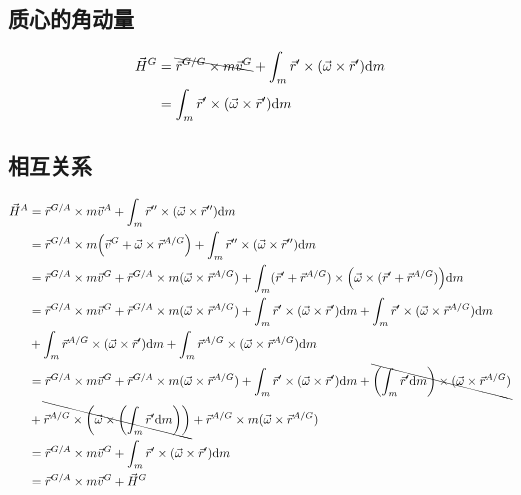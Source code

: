 \subsection{质心的角动量}
\begin{equation}
  \begin{split}
    \vec{H}^G&=\bcancel{\vec{r}^{G/G}\times m\vec{v}^G}+\int_m\vec{r}'\times(\vec{\omega}\times\vec{r}')\mathrm{d}m\\
    &=\int_m\vec{r}'\times(\vec{\omega}\times\vec{r}')\mathrm{d}m
  \end{split}
\end{equation}
\subsection{相互关系}
\begin{equation}
  \begin{split}
    \vec{H}^A&=\vec{r}^{G/A}\times m\vec{v}^A+\int_m\vec{r}''\times(\vec{\omega}\times\vec{r}'')\mathrm{d}m\\
    &=\vec{r}^{G/A}\times m\qty(\vec{v}^G+\vec{\omega}\times\vec{r}^{A/G})+\int_m\vec{r}''\times(\vec{\omega}\times\vec{r}'')\mathrm{d}m\\
    &=\vec{r}^{G/A}\times m\vec{v}^G+\vec{r}^{G/A}\times m(\vec{\omega}\times\vec{r}^{A/G})+\int_m(\vec{r}'+\vec{r}^{A/G})\times\qty(\vec{\omega}\times(\vec{r}'+\vec{r}^{A/G}))\mathrm{d}m\\
    &=\vec{r}^{G/A}\times m\vec{v}^G+\vec{r}^{G/A}\times m(\vec{\omega}\times\vec{r}^{A/G})+\int_m\vec{r}'\times(\vec{\omega}\times\vec{r}')\mathrm{d}m+\int_m\vec{r}'\times(\vec{\omega}\times\vec{r}^{A/G})\mathrm{d}m\\
    &+\int_m\vec{r}^{A/G}\times(\vec{\omega}\times\vec{r}')\mathrm{d}m+\int_m\vec{r}^{A/G}\times(\vec{\omega}\times\vec{r}^{A/G})\mathrm{d}m\\
    &=\vec{r}^{G/A}\times m\vec{v}^G+\vec{r}^{G/A}\times m(\vec{\omega}\times\vec{r}^{A/G})+\int_m\vec{r}'\times(\vec{\omega}\times\vec{r}')\mathrm{d}m+\bcancel{\qty(\int_m\vec{r}'\mathrm{d}m)\times(\vec{\omega}\times\vec{r}^{A/G})}\\
    &+\bcancel{\vec{r}^{A/G}\times\qty(\vec{\omega}\times\qty(\int_m\vec{r}'\mathrm{d}m))}+\vec{r}^{A/G}\times m(\vec{\omega}\times\vec{r}^{A/G})\\
    &=\vec{r}^{G/A}\times m\vec{v}^G+\int_m\vec{r}'\times(\vec{\omega}\times\vec{r}')\mathrm{d}m\\
    &=\vec{r}^{G/A}\times m\vec{v}^G+\vec{H}^G
  \end{split}
\end{equation}

